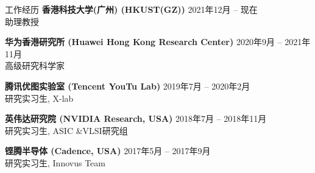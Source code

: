 
\begin{rSection}{工作经历}
{\bf 香港科技大学(广州) (HKUST(GZ))}         \hfill { 2021年12月 -- 现在} \\
助理教授
	
{\bf 华为香港研究所 (Huawei Hong Kong Research Center)}         \hfill { 2020年9月 -- 2021年11月} \\
高级研究科学家

{\bf 腾讯优图实验室 (Tencent YouTu Lab)}         \hfill { 2019年7月 -- 2020年2月} \\
研究实习生, X-lab

{\bf 英伟达研究院 (NVIDIA Research, USA)}               \hfill { 2018年7月 -- 2018年11月} \\
研究实习生, ASIC \&VLSI研究组

{\bf 铿腾半导体 (Cadence, USA)}               \hfill {2017年5月 -- 2017年9月} \\
研究实习生, Innovus Team


\end{rSection}


